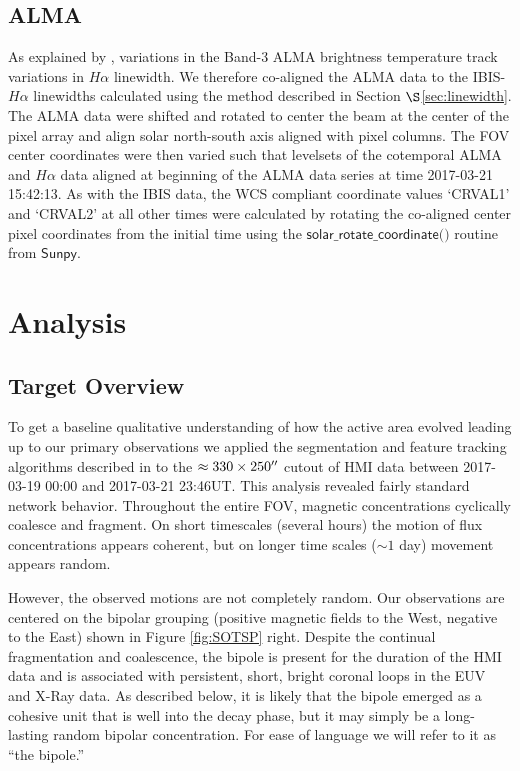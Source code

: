 \documentclass[twocolumn]{aastex62}
\newcommand{\code}[1]{\ensuremath{\textsf{#1}}}
\newcommand{\secref}[1]{$\S$\ref{#1}}
\newcommand{\halpha}{\ensuremath{H\alpha}}
\begin{document}
\subsection{ALMA}\label{sec:almaalign}
As explained by \citet{2019Molnar}, variations in the Band-3 ALMA brightness temperature track variations in \halpha{} linewidth.
We therefore co-aligned the ALMA data to the IBIS-\halpha{} linewidths calculated using the method described in Section \secref{sec:linewidth}.
The ALMA data were shifted and rotated to center the beam at the center of the pixel array and align solar north-south axis aligned with pixel columns.  
The FOV center coordinates were then varied such that levelsets of the cotemporal ALMA and \halpha{} data aligned at beginning of the ALMA data series at time 2017-03-21 15:42:13.  
As with the IBIS data, the WCS compliant coordinate values `CRVAL1' and `CRVAL2' at all other times were calculated by rotating the co-aligned center pixel coordinates from the initial time using the \code{solar\_rotate\_coordinate()} routine from \code{Sunpy}.

\section{Analysis}\label{sec:analysis}
\subsection{Target Overview}
To get a baseline qualitative understanding of how the active area evolved leading up to our primary observations we applied the segmentation and feature tracking algorithms described in \citet{2012Tarr} to the $\approx330\times250\mbox{$^{\prime\prime}$}{}$ cutout of HMI data between 2017-03-19 00:00 and 2017-03-21 23:46UT.  
This analysis revealed fairly standard network behavior.
Throughout the entire FOV, magnetic concentrations cyclically coalesce and fragment.
On short timescales (several hours) the motion of flux concentrations appears coherent, but on longer time scales ($\sim1$ day) movement appears random.   

However, the observed motions are not completely random.
Our observations are centered on the bipolar grouping (positive magnetic fields to the West, negative to the East) shown in Figure \ref{fig:SOTSP} right.
Despite the continual fragmentation and coalescence, the bipole is present for the duration of the HMI data and is associated with persistent, short, bright coronal loops in the EUV and X-Ray data.
As described below, it is likely that the bipole emerged as a cohesive unit that is well into the decay phase, but it may simply be a long-lasting random bipolar concentration. 
For ease of language we will refer to it as ``the bipole.''
\end{document}
